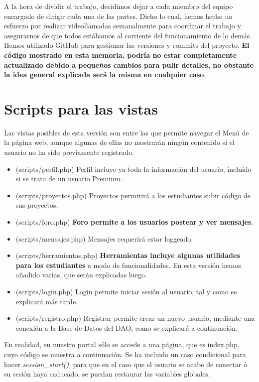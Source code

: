\documentclass[12pt]{report}
\begin{document}
A la hora de dividir el trabajo, decidimos dejar a cada miembro del equipo encargado de dirigir cada una de las partes. Dicho lo cual, hemos hecho un esfuerzo por realizar videollamadas semanalmente para coordinar el trabajo y asegurarnos de que todos estábamos al corriente del funcionamiento de lo demás. Hemos utilizado GitHub para gestionar las versiones y commits del proyecto. \textbf{El código mostrado en esta memoria, podría no estar completamente actualizado debido a pequeños cambios para pulir detalles, no obstante la idea general explicada será la misma en cualquier caso}.
\newpage
\section{Scripts para las vistas}
Las vistas posibles de esta versión son entre las que permite navegar el Menú de la página web, aunque algunas de ellas no mostrarán ningún contenido si el usuario no ha sido previamente registrado.
\begin{itemize}
    \item (scripts/perfil.php) Perfil incluye ya toda la información del usuario, incluido si se trata de un usuario Premium.
    \item (scripts/proyectos.php) Proyectos permitirá a los estudiantes subir código de sus proyectos.
    \item (scripts/foro.php) \textbf{Foro permite a los usuarios postear y ver mensajes}.
    \item (scripts/mensajes.php) Mensajes requerirá estar loggeado.
    \item (scripts/herramientas.php) \textbf{Herramientas incluye algunas utilidades para los estudiantes} a modo de funcionalidades. En esta versión hemos añadido varias, que serán explicadas luego.
    \item (scripts/login.php) Login permite iniciar sesión al usuario, tal y como se explicará más tarde. 
    \item (scripts/registro.php) Registrar permite crear un nuevo usuario, mediante una conexión a la Base de Datos del DAO, como se explicará a continuación.
\end{itemize}

En realidad, en nuestro portal sólo se accede a una página, que es index.php, cuyo código se muestra a continuación. Se ha incluido un caso condicional para hacer \textit{session\_start()}, para que en el caso que el usuario se acabe de conectar ó su sesión haya caducado, se puedan restaurar las variables globales.
\end{document}
